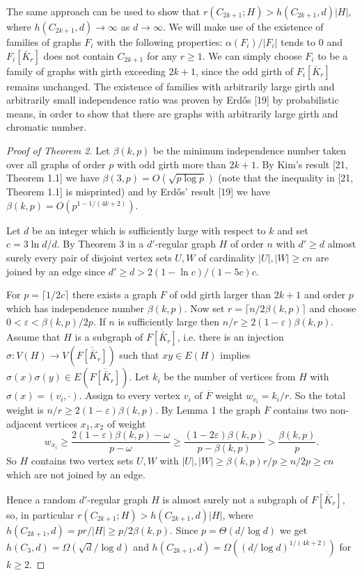 \documentclass[12pt,a4paper]{article}
\begin{document}
The same approach can be used to show that $r(C_{2k+1};H)>h(C_{2k+1},d)|H|$,
where $h(C_{2k+1},d)\to\infty$ as $d\to\infty$. We will make use of the existence of families
of graphs $F_i$ with the following properties: $\alpha(F_i)/|F_i|$ tends to 0 and $F_i[\bar{K}_r]$ does
not contain $C_{2k+1}$ for any $r\ge 1$. We can simply choose $F_i$ to be a family of graphs
with girth exceeding $2k+1$, since the odd girth of $F_i[\bar{K}_r]$ remains unchanged. The
existence of families with arbitrarily large girth and arbitrarily small independence
ratio was proven by Erd\H{o}s [19] by probabilistic means, in order to show that there
are graphs with arbitrarily large girth and chromatic number.

\begin{proof}[Proof of Theorem 2]
Let $\beta(k,p)$ be the minimum independence number taken over all graphs of order
$p$ with odd girth more than $2k+1$. By Kim's result [21, Theorem 1.1] we have
$\beta(3,p)=O(\sqrt{p\log p})$ (note that the inequality in [21, Theorem 1.1] is misprinted)
and by Erd\H{o}s' result [19] we have $\beta(k,p)=O(p^{1-1/(4k+2)})$.

Let $d$ be an integer which is sufficiently large with respect to $k$ and set $c=
3\ln d/d$. By Theorem 3 in a $d'$-regular graph $H$ of order $n$ with $d'\ge d$ almost surely
every pair of disjoint vertex sets $U,W$ of cardinality $|U|,|W|\ge cn$ are joined by an
edge since $d'\ge d>2(1-\ln c)/(1-5c)c$.

For $p=\lceil 1/2c\rceil$ there exists a graph $F$ of odd girth larger than $2k+1$ and order
$p$ which has independence number $\beta(k,p)$. Now set $r=\lceil n/2\beta(k,p)\rceil$ and choose
$0<\varepsilon<\beta(k,p)/2p$. If $n$ is sufficiently large then $n/r\ge 2(1-\varepsilon)\beta(k,p)$. Assume
that $H$ is a subgraph of $\overline{F[\bar{K}_r]}$, i.e. there is an injection $\sigma:V(H)\to V(\overline{F[\bar{K}_r]})$ such
that $xy\in E(H)$ implies $\sigma(x)\sigma(y)\in E(\overline{F[\bar{K}_r]})$. Let $k_i$ be the number of vertices
from $H$ with $\sigma(x)=(v_i,\cdot)$. Assign to every vertex $v_i$ of $\overline{F}$ weight $w_{v_i}=k_i/r$. So
the total weight is $n/r\ge 2(1-\varepsilon)\beta(k,p)$. By Lemma 1 the graph $\overline{F}$ contains two
non-adjacent vertices $x_1,x_2$ of weight
\[
  w_{x_i}\ge \frac{2(1-\varepsilon)\beta(k,p)-\omega}{p-\omega}\ge \frac{(1-2\varepsilon)\beta(k,p)}{p-\beta(k,p)}>
  \frac{\beta(k,p)}{p}.
\]
So $H$ contains two vertex sets $U,W$ with $|U|,|W|\ge \beta(k,p)r/p\ge n/2p\ge cn$ which
are not joined by an edge.

Hence a random $d'$-regular graph $H$ is almost surely not a subgraph of $\overline{F[\bar{K}_r]}$,
so, in particular $r(C_{2k+1};H)>h(C_{2k+1},d)|H|$, where $h(C_{2k+1},d)=pr/|H|\ge
p/2\beta(k,p)$. Since $p=\Theta(d/\log d)$ we get $h(C_3,d)=\Omega(\sqrt{d}/\log d)$ and $h(C_{2k+1},d)=
\Omega((d/\log d)^{1/(4k+2)})$ for $k\ge 2$.
\end{proof}
\end{document}
